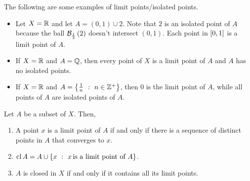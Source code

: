 \begin{Example}
    The following are some examples of limit points/isolated points.
    \begin{itemize}
	\item
	    Let $X = \mathbb{R}$ and let $A = (0,1) \cup {2}$. Note that $2$ is an isolated point of $A$ because the
	    ball $\mathcal{B}_{\frac{1}{3}}\left(2\right)$ doesn't intersect $(0,1)$. Each point in $\interval{0}{1}$ is a limit
	    point of $A$.
	\item
	    If $X = \mathbb{R}$ and $A = \mathbb{Q}$, then every point of $X$ is a limit point of $A$ and $A$ has no isolated
	    points.
	\item
	    If $X = \mathbb{R}$ and $A = \left\lbrace{\frac{1}{n}\hspace{0.05in}}:{\hspace{0.05in}n \in \mathbb{Z}^{+}} \right\rbrace$, then $0$ is the limit point of $A$, while
	    all points of $A$ are isolated points of $A$.
    \end{itemize}
\end{Example}
\begin{Proposition}
    Let $A$ be a subset of $X$. Then,
    \begin{enumerate}
	\item
	    A point $x$ is a limit point of $A$ if and only if there is a sequence of distinct points in $A$
	    that converges to $x$.
	\item
	    $\operatorname{cl}{A} = A \cup \left\lbrace{x\hspace{0.05in}}:{\hspace{0.05in}x\,\text{is a limit point of $A$}} \right\rbrace$.
	\item
	    $A$ is closed in $X$ if and only if it contains all its limit points.
    \end{enumerate}
\end{Proposition}
